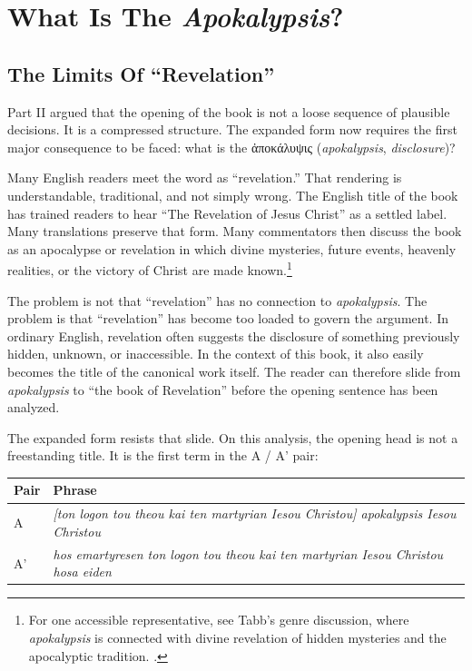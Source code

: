 \chapter{What Is The \textit{Apokalypsis}?}

\section{The Limits Of ``Revelation''}

Part II argued that the opening of the book is not a loose sequence of plausible decisions. It is a compressed structure. The expanded form now requires the first major consequence to be faced: what is the \textgreek{ἀποκάλυψις} (\textit{apokalypsis}, \textit{disclosure})?

Many English readers meet the word as ``revelation.'' That rendering is understandable, traditional, and not simply wrong. The English title of the book has trained readers to hear ``The Revelation of Jesus Christ'' as a settled label. Many translations preserve that form. Many commentators then discuss the book as an apocalypse or revelation in which divine mysteries, future events, heavenly realities, or the victory of Christ are made known.\footnote{For one accessible representative, see Tabb's genre discussion, where \textit{apokalypsis} is connected with divine revelation of hidden mysteries and the apocalyptic tradition. \autocite{tabbTgcRevelation}.}

The problem is not that ``revelation'' has no connection to \textit{apokalypsis}. The problem is that ``revelation'' has become too loaded to govern the argument. In ordinary English, revelation often suggests the disclosure of something previously hidden, unknown, or inaccessible. In the context of this book, it also easily becomes the title of the canonical work itself. The reader can therefore slide from \textit{apokalypsis} to ``the book of Revelation'' before the opening sentence has been analyzed.

The expanded form resists that slide. On this analysis, the opening head is not a freestanding title. It is the first term in the A / A' pair:

\begin{center}
\begin{longtable}{@{}p{}p{}@{}}
\toprule
Pair & Phrase \\
\midrule
A & \textit{[ton logon tou theou kai ten martyrian Iesou Christou] apokalypsis Iesou Christou} \\
A' & \textit{hos emartyresen ton logon tou theou kai ten martyrian Iesou Christou hosa eiden} \\
\bottomrule
\end{longtable}
\end{center}

